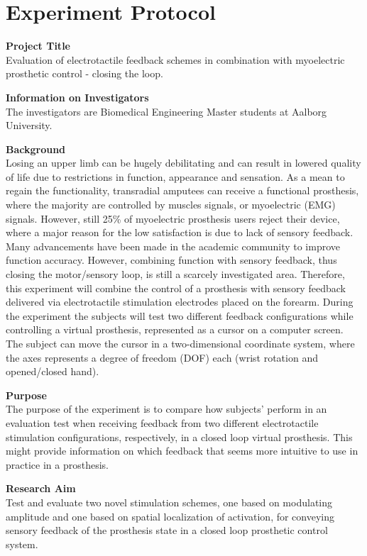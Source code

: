 \section{Experiment Protocol} \label{Ex_protocol}

\textbf{Project Title} \\
Evaluation of electrotactile feedback schemes in combination with myoelectric prosthetic control - closing the loop. 

\textbf{Information on Investigators} \\
The investigators are Biomedical Engineering Master students at Aalborg University. 

\textbf{Background} \\
Losing an upper limb can be hugely debilitating and can result in lowered quality of life due to restrictions in function, appearance and sensation. As a mean to regain the functionality, transradial amputees can receive a functional prosthesis, where the majority are controlled by muscles signals, or myoelectric (EMG) signals. However, still 25\% of myoelectric prosthesis users reject their device, where a major reason for the low satisfaction is due to lack of sensory feedback.
Many advancements have been made in the academic community to improve function accuracy. However, combining function with sensory feedback, thus closing the motor/sensory loop, is still a scarcely investigated area. Therefore, this experiment will combine the control of a prosthesis with sensory feedback delivered via electrotactile stimulation electrodes placed on the forearm. During the experiment the subjects will test two different feedback configurations while controlling a virtual prosthesis, represented as a cursor on a computer screen. The subject can move the cursor in a two-dimensional coordinate system, where the axes represents a degree of freedom (DOF) each (wrist rotation and opened/closed hand).

\textbf{Purpose} \\
The purpose of the experiment is to compare how subjects' perform in an evaluation test when receiving feedback from two different electrotactile stimulation configurations, respectively, in a closed loop virtual prosthesis. This might provide information on which feedback that seems more intuitive to use in practice in a prosthesis.

\textbf{Research Aim} \\
Test and evaluate two novel stimulation schemes, one based on modulating amplitude and one based on spatial localization of activation, for conveying sensory feedback of the prosthesis state in a closed loop prosthetic control system.

